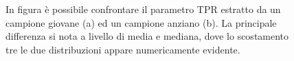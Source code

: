 \documentclass[12pt,a4paper, twoside, openright]{report}
\begin{document}
\begin{figure}[h!]
	\centering
	\hfill
	\caption{In figura è possibile confrontare il parametro TPR estratto da un campione giovane (a) ed un campione anziano (b).
	La principale differenza si nota a livello di media e mediana, dove lo scostamento tre le due distribuzioni appare numericamente evidente.}
	\label{fig:TPR}
\end{figure}
\end{document}
